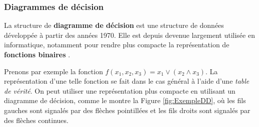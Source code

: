 \subsubsection*{Diagrammes de décision}

La structure de \textbf{diagramme de décision} est une structure de données développée à partir des années 1970. Elle est depuis devenue largement utilisée en informatique, notamment pour rendre plus compacte la représentation de \textbf{fonctions binaires} \cite{Minato_1996}.

Prenons par exemple la fonction $f(x_1, x_2, x_3) = x_1 \lor (x_2 \land x_3)$. La représentation d'une telle fonction se fait dans le cas général à l'aide d'une \textit{table de vérité}. On peut utiliser une représentation plus compacte en utilisant un diagramme de décision, comme le montre la Figure \ref{fig:ExempleDD}, où les fils gauches sont signalés par des flèches pointillées et les fils droits sont signalés par des flèches continues.

